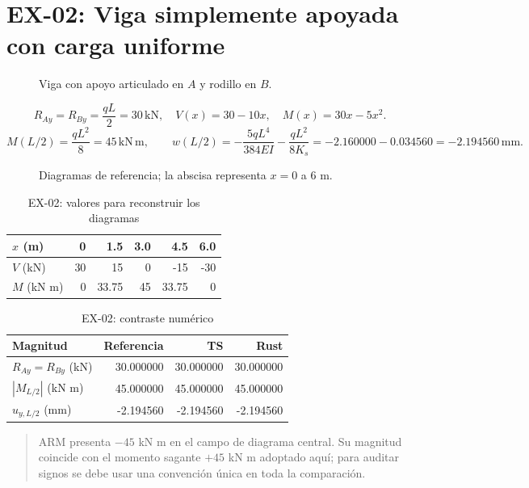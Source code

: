 \documentclass[11pt,a4paper]{article}
\newcommand{\kN}{\,\mathrm{kN}}
\newcommand{\kNm}{\,\mathrm{kN\,m}}
\newcommand{\mm}{\,\mathrm{mm}}
\newcommand{\m}{\,\mathrm{m}}
\newcommand{\caseheading}[2]{\section{#1: #2}}
\newcommand{\note}[1]{\begin{quote}\small\color{armgray}#1\end{quote}}
\begin{document}
\caseheading{EX-02}{Viga simplemente apoyada con carga uniforme}
\begin{figure}[H]\centering
{}
\caption{Viga con apoyo articulado en $A$ y rodillo en $B$.}
\end{figure}
\[
R_{Ay}=R_{By}=\frac{qL}{2}=30\kN,\quad
V(x)=30-10x,\quad M(x)=30x-5x^2.
\]
\[
M(L/2)=\frac{qL^2}{8}=45\kNm,\qquad
w(L/2)=-\frac{5qL^4}{384EI}-\frac{qL^2}{8K_s}
=-2.160000-0.034560=-2.194560\mm.
\]
\begin{figure}[H]\centering
{}
\caption{Diagramas de referencia; la abscisa representa $x=0$ a $6$ m.}
\end{figure}
\begin{table}[H]\centering
\caption{EX-02: valores para reconstruir los diagramas}
\begin{tabular}{@{}lrrrrr@{}}\toprule
$x$ (m) & 0 & 1.5 & 3.0 & 4.5 & 6.0\\\midrule
$V$ (kN) & 30 & 15 & 0 & -15 & -30\\
$M$ (kN m) & 0 & 33.75 & 45 & 33.75 & 0\\
\bottomrule\end{tabular}
\end{table}
\begin{table}[H]\centering
\caption{EX-02: contraste numérico}
\begin{tabular}{@{}lrrr@{}}\toprule
Magnitud & Referencia & TS & Rust\\\midrule
$R_{Ay}=R_{By}$ (kN) & 30.000000 & 30.000000 & 30.000000\\
$|M_{L/2}|$ (kN m) & 45.000000 & 45.000000 & 45.000000\\
$u_{y,L/2}$ (mm) & -2.194560 & -2.194560 & -2.194560\\
\bottomrule\end{tabular}
\end{table}
\note{ARM presenta $-45$ kN m en el campo de diagrama central. Su magnitud
coincide con el momento sagante $+45$ kN m adoptado aquí; para auditar signos
se debe usar una convención única en toda la comparación.}
\end{document}
